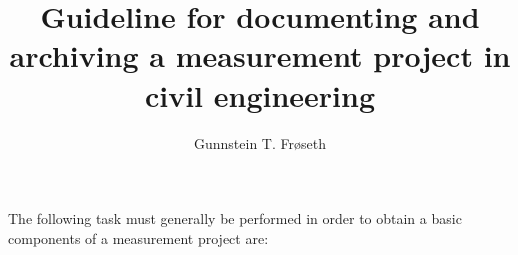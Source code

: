 \message{ !name(metadata-guideline.tex)}\documentclass{article}
\title{Guideline for documenting and archiving a measurement project in civil engineering}
\author{Gunnstein T. Frøseth}
\date{}
\begin{document}
 The following task must generally be performed in order to obtain a  basic components of a measurement project are:

\end{document}
